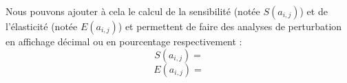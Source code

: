 \documentclass[12pt,a4paper]{article}
\begin{document}
Nous pouvons ajouter à cela le calcul de la sensibilité (notée $S(a_{i, j})$) et de l'élasticité (notée $E(a_{i, j})$) et permettent de faire des analyses de perturbation en affichage décimal ou en pourcentage respectivement :
\begin{equation}
S(a_{i, j})=
\end{equation}
\begin{equation}
E(a_{i, j})=
\end{equation}
\end{document}

